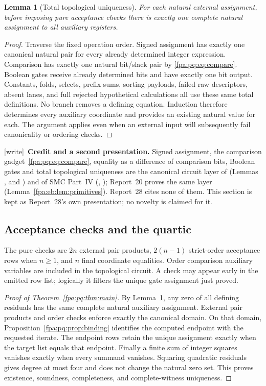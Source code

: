 \documentclass[11pt,a4paper]{article}
\numberwithin{equation}{section}
\newtheorem{lemma}[theorem]{Lemma}
\newcommand{\wtag}{\textup{[write]}}
\begin{document}
\begin{lemma}[Total topological uniqueness]\label{fpa:pq:lem:unique}
For each natural external assignment, before imposing pure acceptance checks there is exactly one complete natural assignment to all auxiliary registers.
\end{lemma}
\begin{proof}
Traverse the fixed operation order. Signed assignment has exactly one canonical natural pair for every already determined integer expression. Comparison has exactly one natural bit/slack pair by \eqref{fpa:pq:eq:compare}. Boolean gates receive already determined bits and have exactly one bit output. Constants, folds, selects, prefix sums, sorting payloads, failed raw descriptors, absent lanes, and full rejected hypothetical calculations all use these same total definitions. No branch removes a defining equation. Induction therefore determines every auxiliary coordinate and provides an existing natural value for each. The argument applies even when an external input will subsequently fail canonicality or ordering checks.
\end{proof}

\wtag\ \textbf{Credit and a second presentation.} Signed assignment, the comparison gadget~\eqref{fpa:pq:eq:compare}, equality as a difference of comparison bits, Boolean gates and total topological uniqueness are the canonical circuit layer of  (Lemmas ,  and ) and of SMC Part~IV (, ); Report~20 proves the same layer (Lemma~\ref{fpa:eb:lem:primitives}). Report~28 cites none of them. This section is kept as Report~28's own presentation; no novelty is claimed for it.

\subsection{Acceptance checks and the quartic}
The pure checks are $2n$ external pair products, $2(n-1)$ strict-order acceptance rows when $n\ge1$, and $n$ final coordinate equalities. Order comparison auxiliary variables are included in the topological circuit. A check may appear early in the emitted row list; logically it filters the unique gate assignment just proved.

\begin{proof}[Proof of Theorem~\ref{fpa:pq:thm:main}]
By Lemma~\ref{fpa:pq:lem:unique}, any zero of all defining residuals has the same complete natural auxiliary assignment. External pair products and order checks enforce exactly the canonical domain. On that domain, Proposition~\ref{fpa:pq:prop:binding} identifies the computed endpoint with the requested iterate. The endpoint rows retain the unique assignment exactly when the target list equals that endpoint. Finally a finite sum of integer squares vanishes exactly when every summand vanishes. Squaring quadratic residuals gives degree at most four and does not change the natural zero set. This proves existence, soundness, completeness, and complete-witness uniqueness.
\end{proof}
\end{document}

